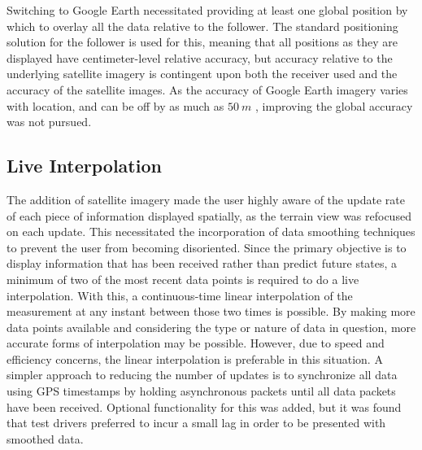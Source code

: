 \documentclass[twocolumn,10pt]{article}
\begin{document}
    Switching to Google Earth necessitated providing at least one global position by which to overlay all the data relative to the follower.  The standard positioning solution for the follower is used for this, meaning that all positions as they are displayed have centimeter-level relative accuracy, but accuracy relative to the underlying satellite imagery is contingent upon both the receiver used and the accuracy of the satellite images.  As the accuracy of Google Earth imagery varies with location, and can be off by as much as $50~m$ \cite{ge_accuracy}, improving the global accuracy was not pursued.


  \subsection*{Live Interpolation}

    The addition of satellite imagery made the user highly aware of the update rate of each piece of information displayed spatially, as the terrain view was refocused on each update.  This necessitated the incorporation of data smoothing techniques to prevent the user from becoming disoriented.
    Since the primary objective is to display information that has been received rather than predict future states, a minimum of two of the most recent data points is required to do a live interpolation.  With this, a continuous-time linear interpolation of the measurement at any instant between those two times is possible.  By making more data points available and considering the type or nature of data in question, more accurate forms of interpolation may be possible. However, due to speed and efficiency concerns, the linear interpolation is preferable in this situation.
    A simpler approach to reducing the number of updates is to synchronize all data using GPS timestamps by holding asynchronous packets until all data packets have been received.  Optional functionality for this was added, but it was found that test drivers preferred to incur a small lag in order to be presented with smoothed data.
    
\end{document}
